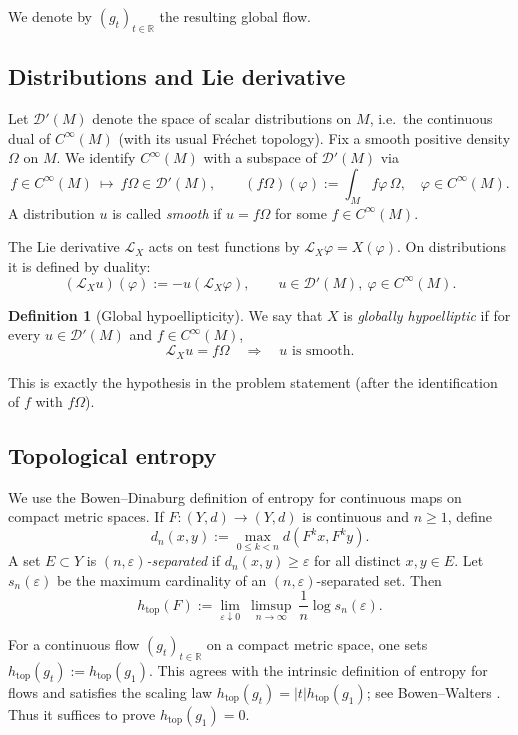 \documentclass[11pt]{article}
\theoremstyle{definition}
\newtheorem{definition}[theorem]{Definition}
\theoremstyle{remark}
\newcommand{\Lie}{\mathcal{L}}
\newcommand{\D}{\mathscr{D}}
\newcommand{\R}{\mathbb{R}}
\newcommand{\htop}{h_{\mathrm{top}}}
\begin{document}
We denote by $(g_t)_{t\in\R}$ the resulting global flow.

\subsection{Distributions and Lie derivative}

Let $\D'(M)$ denote the space of scalar distributions on $M$, i.e.\ the continuous dual of $C^\infty(M)$
(with its usual Fr\'echet topology).
Fix a smooth positive density $\Omega$ on $M$.
We identify $C^\infty(M)$ with a subspace of $\D'(M)$ via
\[
f\in C^\infty(M)\ \longmapsto\ f\Omega\in\D'(M),\qquad
(f\Omega)(\varphi):=\int_M f\varphi\,\Omega,\quad \varphi\in C^\infty(M).
\]
A distribution $u$ is called \emph{smooth} if $u=f\Omega$ for some $f\in C^\infty(M)$.

The Lie derivative $\Lie_X$ acts on test functions by $\Lie_X\varphi=X(\varphi)$.
On distributions it is defined by duality:
\begin{equation}\label{eq:LieDist}
(\Lie_X u)(\varphi):=-u(\Lie_X\varphi),\qquad u\in\D'(M),\ \varphi\in C^\infty(M).
\end{equation}

\begin{definition}[Global hypoellipticity]\label{def:GH}
We say that $X$ is \emph{globally hypoelliptic} if for every $u\in\D'(M)$ and $f\in C^\infty(M)$,
\[
\Lie_X u = f\Omega \quad\Longrightarrow\quad u \text{ is smooth}.
\]
\end{definition}

This is exactly the hypothesis in the problem statement (after the identification of $f$ with $f\Omega$).

\subsection{Topological entropy}
We use the Bowen--Dinaburg definition of entropy for continuous maps on compact metric spaces.
If $F:(Y,d)\to(Y,d)$ is continuous and $n\ge 1$, define
\[
d_n(x,y):=\max_{0\le k<n} d(F^k x, F^k y).
\]
A set $E\subset Y$ is \emph{$(n,\varepsilon)$-separated} if $d_n(x,y)\ge\varepsilon$ for all distinct $x,y\in E$.
Let $s_n(\varepsilon)$ be the maximum cardinality of an $(n,\varepsilon)$-separated set.
Then
\[
\htop(F):=\lim_{\varepsilon\downarrow 0}\ \limsup_{n\to\infty}\ \frac1n\log s_n(\varepsilon).
\]

For a continuous flow $(g_t)_{t\in\R}$ on a compact metric space, one sets $\htop(g_t):=\htop(g_1)$.
This agrees with the intrinsic definition of entropy for flows and satisfies the scaling law
$\htop(g_t)=|t|\htop(g_1)$; see Bowen--Walters \cite{BW}.
Thus it suffices to prove $\htop(g_1)=0$.
\end{document}
